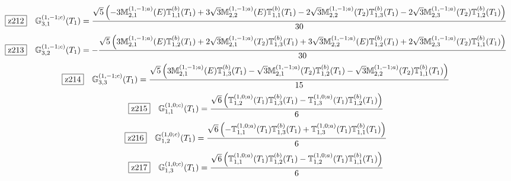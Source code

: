 \documentclass[fleqn,10pt,landscape]{jsarticle}
\begin{document}
\begin{dmath*}
\hspace*{3mm}\fbox{z212}\quad \mathbb{G}_{3,1}^{(1,-1;c)}(T_{1})=\frac{\sqrt{5} \left(- 3 \mathbb{M}_{2,1}^{(1,-1;a)}(E) \mathbb{T}_{1,1}^{(b)}(T_{1}) + 3 \sqrt{3} \mathbb{M}_{2,2}^{(1,-1;a)}(E) \mathbb{T}_{1,1}^{(b)}(T_{1}) - 2 \sqrt{3} \mathbb{M}_{2,2}^{(1,-1;a)}(T_{2}) \mathbb{T}_{1,3}^{(b)}(T_{1}) - 2 \sqrt{3} \mathbb{M}_{2,3}^{(1,-1;a)}(T_{2}) \mathbb{T}_{1,2}^{(b)}(T_{1})\right)}{30}
\end{dmath*}
\begin{dmath*}
\hspace*{3mm}\fbox{z213}\quad \mathbb{G}_{3,2}^{(1,-1;c)}(T_{1})=- \frac{\sqrt{5} \left(3 \mathbb{M}_{2,1}^{(1,-1;a)}(E) \mathbb{T}_{1,2}^{(b)}(T_{1}) + 2 \sqrt{3} \mathbb{M}_{2,1}^{(1,-1;a)}(T_{2}) \mathbb{T}_{1,3}^{(b)}(T_{1}) + 3 \sqrt{3} \mathbb{M}_{2,2}^{(1,-1;a)}(E) \mathbb{T}_{1,2}^{(b)}(T_{1}) + 2 \sqrt{3} \mathbb{M}_{2,3}^{(1,-1;a)}(T_{2}) \mathbb{T}_{1,1}^{(b)}(T_{1})\right)}{30}
\end{dmath*}
\begin{dmath*}
\hspace*{3mm}\fbox{z214}\quad \mathbb{G}_{3,3}^{(1,-1;c)}(T_{1})=\frac{\sqrt{5} \left(3 \mathbb{M}_{2,1}^{(1,-1;a)}(E) \mathbb{T}_{1,3}^{(b)}(T_{1}) - \sqrt{3} \mathbb{M}_{2,1}^{(1,-1;a)}(T_{2}) \mathbb{T}_{1,2}^{(b)}(T_{1}) - \sqrt{3} \mathbb{M}_{2,2}^{(1,-1;a)}(T_{2}) \mathbb{T}_{1,1}^{(b)}(T_{1})\right)}{15}
\end{dmath*}
\begin{dmath*}
\hspace*{3mm}\fbox{z215}\quad \mathbb{G}_{1,1}^{(1,0;c)}(T_{1})=\frac{\sqrt{6} \left(\mathbb{T}_{1,2}^{(1,0;a)}(T_{1}) \mathbb{T}_{1,3}^{(b)}(T_{1}) - \mathbb{T}_{1,3}^{(1,0;a)}(T_{1}) \mathbb{T}_{1,2}^{(b)}(T_{1})\right)}{6}
\end{dmath*}
\begin{dmath*}
\hspace*{3mm}\fbox{z216}\quad \mathbb{G}_{1,2}^{(1,0;c)}(T_{1})=\frac{\sqrt{6} \left(- \mathbb{T}_{1,1}^{(1,0;a)}(T_{1}) \mathbb{T}_{1,3}^{(b)}(T_{1}) + \mathbb{T}_{1,3}^{(1,0;a)}(T_{1}) \mathbb{T}_{1,1}^{(b)}(T_{1})\right)}{6}
\end{dmath*}
\begin{dmath*}
\hspace*{3mm}\fbox{z217}\quad \mathbb{G}_{1,3}^{(1,0;c)}(T_{1})=\frac{\sqrt{6} \left(\mathbb{T}_{1,1}^{(1,0;a)}(T_{1}) \mathbb{T}_{1,2}^{(b)}(T_{1}) - \mathbb{T}_{1,2}^{(1,0;a)}(T_{1}) \mathbb{T}_{1,1}^{(b)}(T_{1})\right)}{6}
\end{dmath*}
\end{document}
